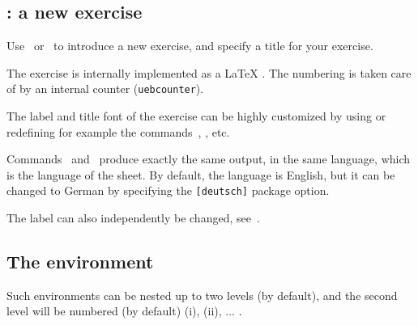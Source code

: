 \documentclass[11pt,a4paper]{article}
\begin{document}
\subsection{: a new exercise}

Use~ or~ to introduce a new exercise, and specify a
title for your exercise.


The exercise is internally implemented as a \LaTeX{} . The numbering is
taken care of by an internal counter (\texttt{uebcounter}).

The label and title font of the exercise can be highly customized by using or redefining
for example the commands~, ,
 etc.


\begin{pkgnotice}
  Commands~ and~ produce exactly the same output, in
  the same language, which is the language of the sheet. By default, the language is
  English, but it can be changed to German by specifying the \texttt{[deutsch]} package
  option.

  The label can also independently be changed, see~.
\end{pkgnotice}



\subsection{The  environment}


Such  environments can be nested up to two levels (by default), and
the second level will be numbered (by default) (i), (ii), ... .
\end{document}
